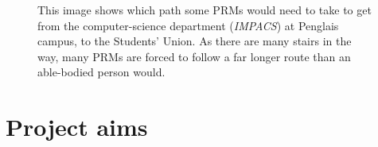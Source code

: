 \begin{figure}
	\centering
	\caption[Longer routes for Persons with Reduced Mobility]{This image shows which path some PRMs would need to take to get from the computer-science department (\textit{IMPACS}) at Penglais campus, to the Students' Union. As there are many stairs in the way, many PRMs are forced to follow a far longer route than an able-bodied person would.}
	\label{fig:longerRoutePRM}
\end{figure}

\section{Project aims}


